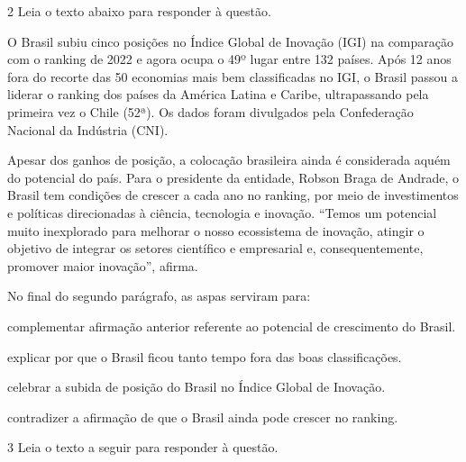 \num{2} Leia o texto abaixo para responder à questão.

\begin{myquote}

O Brasil subiu cinco posições no Índice Global de Inovação (IGI) na comparação
com o ranking de 2022 e agora ocupa o 49º lugar entre 132 países. Após 12 anos
fora do recorte das 50 economias mais bem classificadas no IGI, o Brasil
passou a liderar o ranking dos países da América Latina e Caribe,
ultrapassando pela primeira vez o Chile (52ª). Os dados foram divulgados pela 
Confederação Nacional da Indústria (CNI).

Apesar dos ganhos de posição, a colocação brasileira ainda é considerada aquém 
do potencial do país. Para o presidente da entidade, Robson Braga de Andrade, 
o Brasil tem condições de crescer a cada ano no ranking, por meio de investimentos 
e políticas direcionadas à ciência, tecnologia e inovação. ``Temos um potencial muito
inexplorado para melhorar o nosso ecossistema de inovação, atingir o objetivo de 
integrar os setores científico e empresarial e, consequentemente, promover maior 
inovação'', afirma.


\end{myquote}

No final do segundo parágrafo, as aspas serviram para:

\begin{escolha}

  \item complementar afirmação anterior referente ao potencial de crescimento do Brasil.

  \item explicar por que o Brasil ficou tanto tempo fora das boas classificações.

  \item celebrar a subida de posição do Brasil no Índice Global de Inovação.

  \item contradizer a afirmação de que o Brasil ainda pode crescer no ranking.

\end{escolha}


\num{3} Leia o texto a seguir para responder à questão. 

